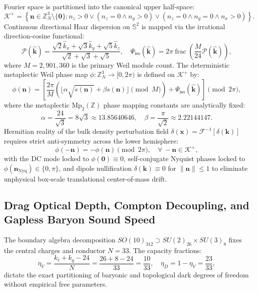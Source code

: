 \documentclass[11pt]{article}
\theoremstyle{plain}
\begin{document}
Fourier space is partitioned into the canonical upper half-space:
\begin{equation}
\mathcal{K}^+ = \left\{ \mathbf{n} \in \mathbb{Z}_N^3 \setminus \{\mathbf{0}\} : n_z > 0 \lor (n_z = 0 \land n_y > 0) \lor (n_z = 0 \land n_y = 0 \land n_x > 0) \right\}.
\end{equation}
Continuous directional Haar dispersion on $\mathbb{S}^2$ is mapped via the irrational direction-cosine functional:
\begin{equation}
\mathcal{P}(\hat{\mathbf{k}}) = \frac{\sqrt{2}\hat{k}_x + \sqrt{3}\hat{k}_y + \sqrt{5}\hat{k}_z}{\sqrt{2} + \sqrt{3} + \sqrt{5}}, \quad \Psi_{\mathrm{iso}}(\hat{\mathbf{k}}) = 2\pi \operatorname{frac}\left( \frac{M}{24} \mathcal{P}(\hat{\mathbf{k}}) \right),
\end{equation}
where $M = 2{,}901{,}360$ is the primary Weil module count. The deterministic metaplectic Weil phase map $\phi: \mathbb{Z}_N^3 \to [0, 2\pi)$ is defined on $\mathcal{K}^+$ by:
\begin{equation}
\phi(\mathbf{n}) = \left[ \frac{2\pi}{M} \left( \lfloor \alpha \sqrt{s(\mathbf{n})} + \beta s(\mathbf{n}) \rfloor \pmod M \right) + \Psi_{\mathrm{iso}}(\hat{\mathbf{k}}) \right] \pmod{2\pi},
\end{equation}
where the metaplectic $\mathrm{Mp}_2(\mathbb{Z})$ phase mapping constants are analytically fixed:
\begin{equation}
\alpha = \frac{24}{\sqrt{3}} = 8\sqrt{3} \approx 13.85640646, \quad \beta = \frac{\pi}{\sqrt{2}} \approx 2.22144147.
\end{equation}
Hermitian reality of the bulk density perturbation field $\delta(\mathbf{x}) = \mathcal{F}^{-1}[\delta(\mathbf{k})]$ requires strict anti-symmetry across the lower hemisphere:
\begin{equation}
\phi(-\mathbf{n}) = -\phi(\mathbf{n}) \pmod{2\pi}, \quad \forall \, -\mathbf{n} \in \mathcal{K}^+,
\end{equation}
with the DC mode locked to $\phi(\mathbf{0}) \equiv 0$, self-conjugate Nyquist phases locked to $\phi(\mathbf{n}_{\mathrm{Nyq}}) \in \{0, \pi\}$, and dipole nullification $\delta(\mathbf{k}) \equiv 0$ for $\|\mathbf{n}\| \le 1$ to eliminate unphysical box-scale translational center-of-mass drift.

\subsection{Drag Optical Depth, Compton Decoupling, and Gapless Baryon Sound Speed}
\label{app:drag-compton-sound-speed}
The boundary algebra decomposition $SO(10)_{312} \supset SU(2)_{26} \times SU(3)_8$ fixes the central charges and conductor $N = 33$. The capacity fractions:
\begin{equation}
\eta_V = \frac{k_\ell + k_q - 24}{N} = \frac{26 + 8 - 24}{33} = \frac{10}{33}, \quad \eta_D = 1 - \eta_V = \frac{23}{33},
\end{equation}
dictate the exact partitioning of baryonic and topological dark degrees of freedom without empirical free parameters.
\end{document}
